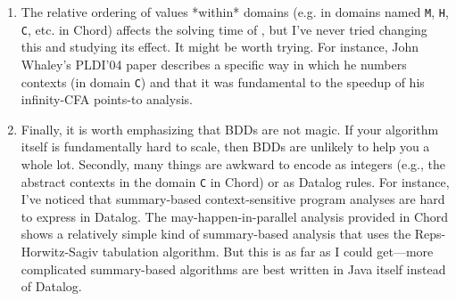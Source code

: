 \begin{enumerate}
\item
The relative ordering of values *within* domains (e.g.
in domains named \verb+M+, \verb+H+, \verb+C+, etc. in Chord) affects the
solving time of \bddbddb, but
I've never tried changing this and studying its effect.  It might be
worth trying.  For instance, John Whaley's PLDI'04 paper describes a
specific way in which he numbers contexts (in domain \verb+C+) and that it was
fundamental to the speedup of his infinity-CFA points-to analysis.

\item

Finally, it is worth emphasizing that BDDs are not magic.
If your algorithm itself is fundamentally hard to scale, then BDDs are
unlikely to help you a whole lot.  Secondly, many things are awkward to
encode as integers (e.g., the abstract contexts in the domain \verb+C+ 
in Chord) or as Datalog rules.
For instance, I've noticed that summary-based context-sensitive program
analyses are hard to express in Datalog.  The may-happen-in-parallel
analysis provided in Chord shows a relatively simple kind of summary-based
analysis that uses the Reps-Horwitz-Sagiv tabulation algorithm.  But this
is as far as I could get---more complicated summary-based algorithms are
best written in Java itself instead of Datalog.
\end{enumerate}
